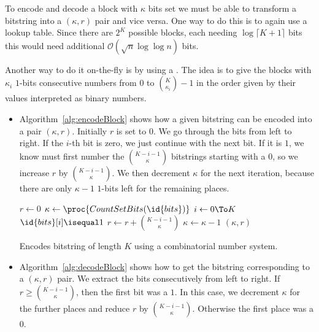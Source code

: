To encode and decode a block with $\kappa$ bits set we must be able to transform a bitstring into a $(\kappa, r)$ pair and vice versa. One way to do this is to again use a lookup table. Since there are $2^K$ possible blocks, each needing $\log \lceil K + 1 \rceil$ bits this would need additional $\mathcal{O}\left(\sqrt{n}\log\log n\right)$ bits.

Another way to do it on-the-fly is by using a . The idea is to give the blocks with $\kappa_i$ $1$-bits consecutive numbers from $0$ to $\binom{K}{\kappa_i}-1$ in the order given by their values interpreted as binary numbers.

\begin{itemize}
  \item Algorithm~\ref{alg:encodeBlock} shows how a given bitstring  can be encoded into a pair $(\kappa, r)$. Initially $r$ is set to $0$. We go through the bits from left to right. If the $i$-th bit is zero, we just continue with the next bit. If it is $1$, we know must first number the $\binom{K - i - 1}{\kappa}$ bitstrings starting with a $0$, so we increase $r$ by $\binom{K - i - 1}{\kappa}$. We then decrement $\kappa$ for the next iteration, because there are only $\kappa - 1$ $1$-bits left for the remaining places.

  \begin{algorithm}[htb]
    \begin{codebox}
      \li $r \gets 0$
      \li $\kappa \gets \proc{CountSetBits(\id{bits})}$
      \li \For $i \gets 0 \To K$
          \Do
      \li   \If $\id{bits}[i] \isequal 1$
            \Then
      \li     $r \gets r + \binom{K - i - 1}{\kappa}$
      \li     $\kappa \gets \kappa - 1$
            \End
          \End
      \li \Return $(\kappa, r)$
    \end{codebox}
    \caption{Encodes bitstring  of length $K$ using a combinatorial number system.}
    \label{alg:encodeBlock}
  \end{algorithm}

  \item Algorithm~\ref{alg:decodeBlock} shows how to get the bitstring corresponding to a $(\kappa, r)$ pair. We extract the bits consecutively from left to right. If $r \geq \binom{K - i - 1}{\kappa}$, then the first bit was a $1$. In this case, we decrement $\kappa$ for the further places and reduce $r$ by $\binom{K - i - 1}{\kappa}$. Otherwise the first place was a $0$.


\end{itemize}
